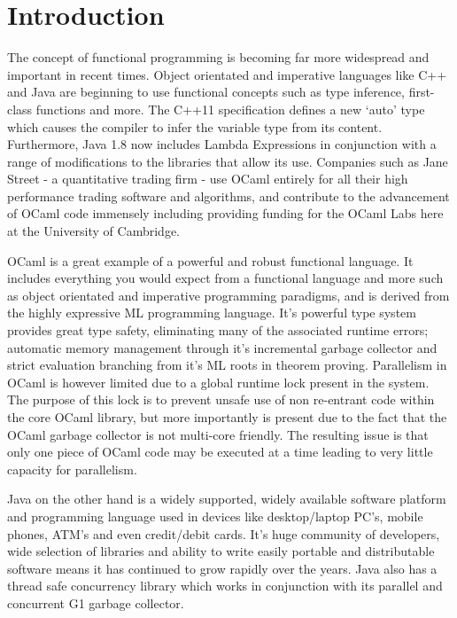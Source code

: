 \documentclass[a4paper]{article}
\begin{document}


\section{Introduction}
\label{sec:introduction}
The concept of functional programming is becoming far more widespread and important in recent times. Object orientated and imperative languages like C++ and Java are beginning to use functional concepts such as type inference, first-class functions and more. The C++11 specification defines a new `auto' type which causes the compiler to infer the variable type from its content\cite{web:autokeyword}. Furthermore, Java 1.8 now includes Lambda Expressions in conjunction with a range of modifications to the libraries that allow its use\cite{web:javalambda}. Companies such as Jane Street - a quantitative trading firm - use OCaml entirely for all their high performance trading software and algorithms\cite{web:janestreettech}, and contribute to the advancement of OCaml code immensely including providing funding for the OCaml Labs here at the University of Cambridge.

OCaml is a great example of a powerful and robust functional language. It includes everything you would expect from a functional language and more such as object orientated and imperative programming paradigms, and is derived from the highly expressive ML programming language. It's powerful type system provides great type safety, eliminating many of the associated runtime errors; automatic memory management through it's incremental garbage collector and strict evaluation branching from it's ML roots in theorem proving. Parallelism in OCaml is however limited due to a global runtime lock present in the system. The purpose of this lock is to prevent unsafe use of non re-entrant code within the core OCaml library, but more importantly is present due to the fact that the OCaml garbage collector is not multi-core friendly\cite{clerc2012}. The resulting issue is that only one piece of OCaml code may be executed at a time leading to very little capacity for parallelism.

Java on the other hand is a widely supported, widely available software platform and programming language used in devices like desktop/laptop PC's, mobile phones, ATM's and even credit/debit cards\cite{web:aboutjava}. It's huge community of developers, wide selection of libraries and ability to write easily portable and distributable software means it has continued to grow rapidly over the years. Java also has a thread safe concurrency library which works in conjunction with its parallel and concurrent G1 garbage collector.
\end{document}
